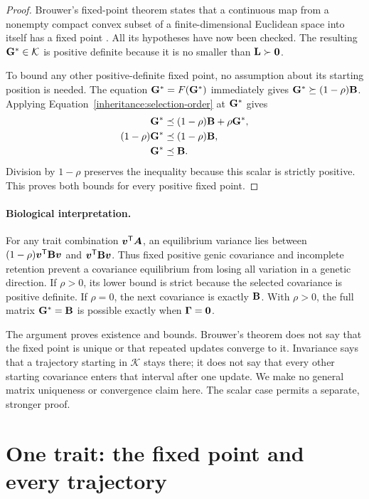 \begin{proof}
  Brouwer's fixed-point theorem states that a continuous map from a
  nonempty compact convex subset of a finite-dimensional Euclidean
  space into itself has a fixed point \citep{GranasDugundji2003}.
  All its hypotheses have now been checked. The resulting
  $\mathbf{G}^*\in\mathcal K$ is positive
  definite because it is no smaller than $\mathbf{L}\succ\mathbf{0}$.

  To bound any other positive-definite fixed point, no assumption
  about its starting position is needed. The equation
  $\mathbf{G}^*=F(\mathbf{G}^*)$ immediately gives
  $\mathbf{G}^*\succeq(1-\rho)\mathbf{B}$. Applying
  Equation~\eqref{inheritance:selection-order} at $\mathbf{G}^*$ gives
  \begin{align}
    \mathbf{G}^*&\preceq(1-\rho)\mathbf{B}+\rho\mathbf{G}^*,\\
    (1-\rho)\mathbf{G}^*&\preceq(1-\rho)\mathbf{B},\\
    \mathbf{G}^*&\preceq\mathbf{B}.
  \end{align}
  Division by $1-\rho$ preserves the inequality because this scalar
  is strictly positive. This proves both bounds for every positive
  fixed point.
\end{proof}

\paragraph{Biological interpretation.}
For any trait combination $\boldsymbol{v}^{\mathsf T}\boldsymbol{A}$, an equilibrium
variance lies between $(1-\rho)\boldsymbol{v}^{\mathsf T}\mathbf{B}\boldsymbol{v}$ and
$\boldsymbol{v}^{\mathsf T}\mathbf{B}\boldsymbol{v}$. Thus fixed positive genic covariance
and incomplete retention prevent a covariance equilibrium from losing all
variation in a genetic direction. If $\rho>0$, its lower bound is strict
because the selected covariance is positive definite. If $\rho=0$, the
next covariance is exactly $\mathbf{B}$. With $\rho>0$, the full matrix
$\mathbf{G}^*=\mathbf{B}$ is possible exactly when $\boldsymbol{\Gamma}=\mathbf{0}$.

The argument proves existence and bounds. Brouwer's theorem does not say
that the fixed point is unique or that repeated updates converge to it.
Invariance says that a trajectory starting in $\mathcal K$ stays there;
it does not say that every other starting covariance enters that interval
after one update. We make no general matrix uniqueness or convergence
claim here. The scalar case permits a separate, stronger proof.

\section{One trait: the fixed point and every trajectory}
\label{inheritance:scalar}


